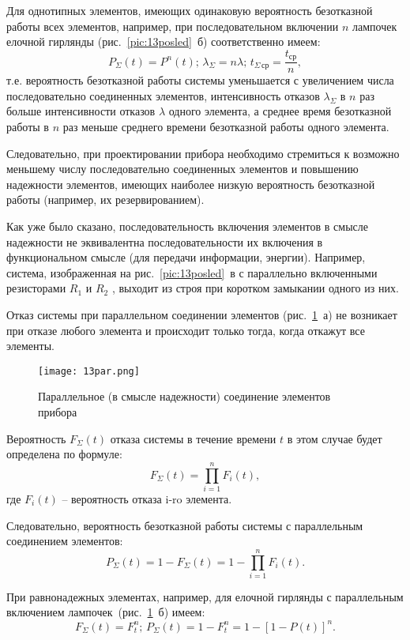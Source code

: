 \begin{enumerate}
Для однотипных элементов, имеющих одинаковую вероятность безотказной работы всех элементов, например, при последовательном включении $ n $ лампочек елочной гирлянды (рис.~\ref{pic:13posled}~б) соответственно имеем:
\[ P_\Sigma(t) = P^n(t); \, \lambda_\Sigma = n\lambda; \, t_{\Sigma\,\text{ср}} = \dfrac{t_\text{ср}}{n}, \]
т.е. вероятность безотказной работы системы уменьшается с увеличением числа последовательно соединенных элементов, интенсивность отказов $ \lambda_\Sigma $ в $ n $ раз больше интенсивности отказов $ \lambda $ одного элемента, а среднее время безотказной работы в $ n $ раз меньше среднего времени безотказной работы одного элемента.

Следовательно, при проектировании прибора необходимо стремиться к возможно меньшему числу последовательно соединенных элементов и повышению надежности элементов, имеющих наиболее низкую вероятность безотказной работы (например, их резервированием).

Как уже было сказано, последовательность включения элементов в смысле надежности не эквивалентна последовательности их включения в функциональном смысле (для передачи информации, энергии). Например, система, изображенная на рис.~\ref{pic:13posled}~в с параллельно включенными резисторами $ R_1 $ и $ R_2 $ , выходит из строя при коротком замыкании одного из них.

Отказ системы при параллельном соединении элементов (рис.~\ref{pic:13par}~а) не возникает при отказе любого элемента и происходит только тогда, когда откажут все элементы.

\begin{figure}[h!]
	\caption{ Параллельное (в смысле надежности) соединение элементов прибора }
	\texttt{[image: 13par.png]}
	\label{pic:13par}
\end{figure}

Вероятность $ F_\Sigma (t) $ отказа системы в течение времени $ t $ в этом случае будет определена по формуле:
\[ F_\Sigma (t) = \prod\limits_{i=1}^{n}F_i (t), \]
где $ F_i(t) $ -- вероятность отказа i-ro элемента.

Следовательно, вероятность безотказной работы системы с параллельным соединением элементов:
\[ P_\Sigma (t) = 1 - F_\Sigma (t) = 1 - \prod\limits_{i=1}^{n} F_i (t). \]

При равнонадежных элементах, например, для елочной гирлянды с параллельным включением лампочек~(рис.~\ref{pic:13par}~б) имеем:
\[ F_\Sigma (t) = F_t^n; \, P_\Sigma(t) = 1 - F^n_t = 1 - [1-P(t)]^n. \]


\end{enumerate}
